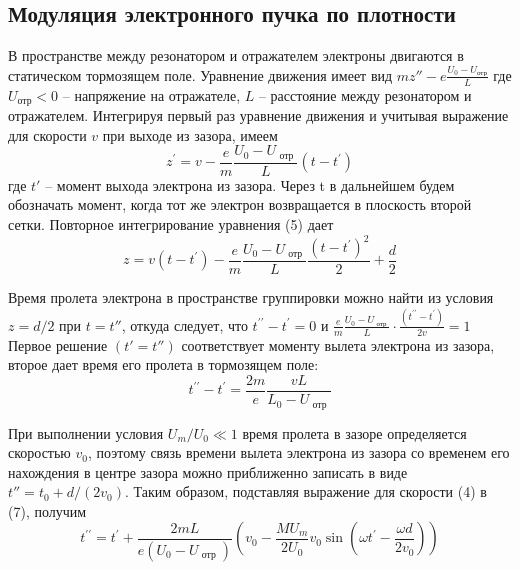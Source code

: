 \documentclass[a4paper,14pt]{extarticle}
\begin{document}
\subsection{Модуляция электронного пучка по плотности}

В пространстве между резонатором и отражателем электроны двигаются в статическом тормозящем поле. Уравнение движения имеет вид 
$mz''- e \frac { U _ { 0 } - U _ { \text{отр} } } { L }$ где $U_{\text{отр}} < 0$ -- напряжение на отражателе, $L$ -- расстояние между резонатором и отражателем. Интегрируя первый раз уравнение движения и учитывая выражение для скорости $v$ при выходе из зазора, имеем
\begin{equation}
  z ^ { \prime } = v - \frac { e } { m } \frac { U _ { 0 } - U _ { \text { отр } } } { L } \left( t - t ^ { \prime } \right)
\end{equation}
где $t'$ -- момент выхода электрона из зазора. Через t в дальнейшем будем обозначать момент, когда тот же электрон возвращается в плоскость второй сетки. Повторное интегрирование уравнения (5) дает
\begin{equation}
  z = v \left( t - t ^ { \prime } \right) - \frac { e } { m } \frac { U _ { 0 } - U _ { \text { отр } } } { L } \frac { \left( t - t ^ { \prime } \right) ^ { 2 } } { 2 } + \frac { d } { 2 }
\end{equation}

Время пролета электрона в пространстве группировки можно найти из условия $z = d / 2$ при $t=t''$, откуда следует, что 
$t ^ { \prime \prime } - t ^ { \prime } = 0$ и 
$\frac { e } { m } \frac { U _ { 0 } - U _ { \text { отр } } } { L }\cdot \frac { \left( t ^ { \prime \prime } - t ^ { \prime } \right) } { 2 v } = 1$
Первое решение $(t' = t'' )$ соответствует моменту вылета электрона из зазора, второе дает время его пролета в тормозящем поле:
\begin{equation}
  t ^ { \prime \prime } - t ^ { \prime } = \frac { 2 m } { e } \frac { v L } { L _ { 0 } - U _ { \text { отр } } }
\end{equation}

При выполнении условия $U_{ m } / U _{ 0 } \ll 1$ время пролета в зазоре определяется скоростью $v_0$, поэтому связь времени вылета электрона из зазора со временем его нахождения в центре зазора можно приближенно записать в виде
$t'' = t _ { 0 } + d / \left( 2 v _ { 0 } \right)$. Таким образом, подставляя выражение для скорости (4) в (7), получим
\begin{equation}
  t ^ { \prime \prime } = t ^ { \prime } + \frac { 2 m L } { e \left( U _ { 0 } - U _ { \text { отр } } \right) } \left( v _ { 0 } - \frac { M U _ { m } } { 2 U _ { 0 } } v _ { 0 } \sin \left( \omega t ^ { \prime } - \frac { \omega d } { 2 v _ { 0 } } \right) \right)
\end{equation}
\end{document}
